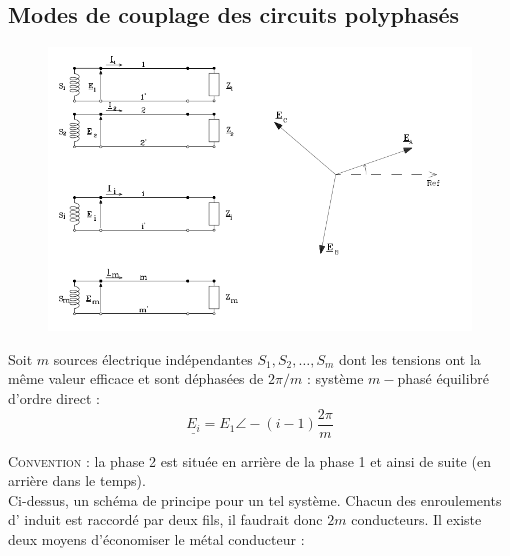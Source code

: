 \subsection{Modes de couplage des circuits polyphasés}
\begin{figure}
	\vspace{-8mm}
	\includegraphics[scale=0.34]{ch1/image5.png}
\end{figure}	
Soit $m$ sources électrique indépendantes $S_1, S_2,\dots,S_m$ dont les tensions 
ont la même valeur efficace et sont déphasées de $2\pi/m$ : système $m-$phasé 
équilibré d'ordre direct :
\begin{equation}
	\underline{E_i} = E_{1} \angle -(i-1)\frac{2\pi}{m}
\end{equation}


\textsc{Convention :} la phase 2 est située en arrière de la phase 1 et ainsi de suite (en arrière dans le temps).\\
	
Ci-dessus, un schéma de principe pour un tel système. Chacun des enroulements d'
induit est raccordé par deux fils, il faudrait donc $2m$ conducteurs. Il existe 
deux moyens d'économiser le métal conducteur :
	
